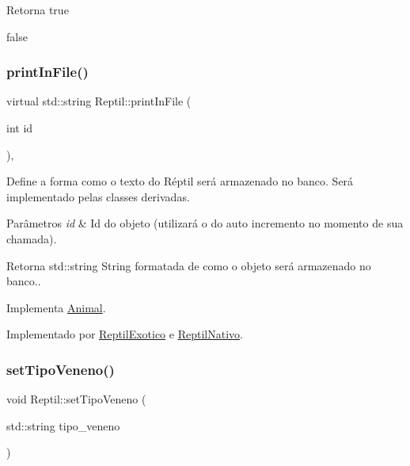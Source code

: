 \begin{DoxyReturn}{Retorna}
true 

false 
\end{DoxyReturn}
\mbox{\label{classReptil_a53fd59f3aed9c2d463722a8e97401406}} 
\subsubsection{\texorpdfstring{print\+In\+File()}{printInFile()}}
{\footnotesize\ttfamily virtual std\+::string Reptil\+::print\+In\+File (\begin{DoxyParamCaption}\item[{int}]{id }\end{DoxyParamCaption})\hspace{0.3cm}{\ttfamily [protected]}, {}}



Define a forma como o texto do Réptil será armazenado no banco. Será implementado pelas classes derivadas. 


\begin{DoxyParams}{Parâmetros}
{\em id} & Id do objeto (utilizará o do auto incremento no momento de sua chamada). \\
\hline
\end{DoxyParams}
\begin{DoxyReturn}{Retorna}
std\+::string String formatada de como o objeto será armazenado no banco.. 
\end{DoxyReturn}


Implementa \hyperlink{classAnimal_ac75406040726a6339932d70164cc7242}{Animal}.



Implementado por \hyperlink{classReptilExotico_a71312f425b92e04d8f29a856abd83f26}{Reptil\+Exotico} e \hyperlink{classReptilNativo_ac801a11c87a2847fb4b46488aa6bb789}{Reptil\+Nativo}.

\mbox{\label{classReptil_a3a91e206459f45bf2f951e914b3bc195}} 
\subsubsection{\texorpdfstring{set\+Tipo\+Veneno()}{setTipoVeneno()}}
{\footnotesize\ttfamily void Reptil\+::set\+Tipo\+Veneno (\begin{DoxyParamCaption}\item[{std\+::string}]{tipo\+\_\+veneno }\end{DoxyParamCaption})}



